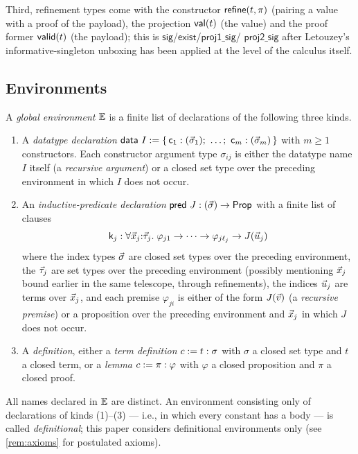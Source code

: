 Third, refinement types come with the constructor $\mathsf{refine}(t,\pi)$
(pairing a value with a proof of the payload), the projection $\mathsf{val}(t)$
(the value) and the proof former $\mathsf{valid}(t)$ (the payload); this is
$\mathsf{sig}$/$\mathsf{exist}$/$\mathsf{proj1\_sig}$/%
$\mathsf{proj2\_sig}$ after Letouzey's informative-singleton unboxing
\cite[\S 4.3]{Letouzey2004} has been applied at the level of the calculus
itself.

\subsection{Environments}
\label{sec:calculus-env}

\begin{definition}
\label{def:env}
A \emph{global environment} $\mathbb{E}$ is a finite list of declarations of the
following three kinds.
\begin{enumerate}[leftmargin=2em]
\item A \emph{datatype declaration}
  $\mathsf{data}\ I \mathrel{:=} \{\, \mathsf{c}_1 : (\vec{\sigma}_1);\ \dots;\
  \mathsf{c}_m : (\vec{\sigma}_m) \,\}$ with $m \geq 1$ constructors.  Each
  constructor argument type $\sigma_{ij}$ is either the datatype name $I$
  itself (a \emph{recursive argument}) or a closed set type over the
  preceding environment in which $I$ does not occur.
\item An \emph{inductive-predicate declaration}
  $\mathsf{pred}\ J : (\vec{\sigma}) \to \mathsf{Prop}$ with a finite list of
  clauses
  \[
    \mathsf{k}_j : \forall \vec{x}_j{:}\vec{\tau}_j.\;
      \varphi_{j1} \to \dots \to \varphi_{j\ell_j} \to J(\vec{u}_j)
  \]
  where the index types $\vec{\sigma}$ are closed set types over the
  preceding environment, the $\vec{\tau}_j$ are set types over the
  preceding environment (possibly mentioning $\vec{x}_j$ bound earlier in
  the same telescope, through refinements), the indices $\vec{u}_j$ are
  terms over $\vec{x}_j$, and each premise $\varphi_{ji}$ is either of the
  form $J(\vec{v})$ (a \emph{recursive premise}) or a proposition over the
  preceding environment and $\vec{x}_j$ in which $J$ does not occur.
\item A \emph{definition}, either a \emph{term definition}
  $c \mathrel{:=} t : \sigma$ with $\sigma$ a closed set type and $t$ a closed
  term, or a \emph{lemma} $c \mathrel{:=} \pi : \varphi$ with $\varphi$ a closed
  proposition and $\pi$ a closed proof.
\end{enumerate}
All names declared in $\mathbb{E}$ are distinct.  An environment consisting only
of declarations of kinds (1)--(3) --- i.e., in which every constant has a
body --- is called \emph{definitional}; this paper considers definitional
environments only (see \cref{rem:axioms} for postulated axioms).
\end{definition}

